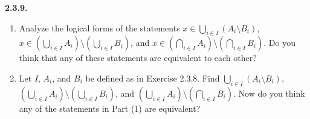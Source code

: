 \documentclass[12pt]{amsart}
\newenvironment{statement}[1]{\smallskip\noindent\color[rgb]{.6627, .3529, .6314} {\bf #1.}}{}
\theoremstyle{definition}
\theoremstyle{remark}
\begin{document}
\begin{statement}{2.3.9}
\begin{enumerate}
	\item Analyze the logical forms of the statements
	$x \in \bigcup_{i \in I} (A_i \setminus B_i)$,
	$x \in \left( \bigcup_{i \in I} A_i \right) \setminus \left( \bigcup_{i \in I} B_i \right)$, and
	$x \in \left( \bigcap_{i \in I} A_i \right) \setminus \left( \bigcap_{i \in I} B_i \right)$.
	Do you think that any of these statements are equivalent to each other?
	
	\item Let $I$, $A_i$, and $B_i$ be defined as in Exercise 2.3.8.
	Find $\bigcup_{i \in I} (A_i \setminus B_i)$,
	$\left( \bigcup_{i \in I} A_i \right) \setminus \left( \bigcup_{i \in I} B_i \right)$, and
	$\left( \bigcup_{i \in I} A_i \right) \setminus \left( \bigcap_{i \in I} B_i \right)$.
	Now do you think any of the statements in Part (1) are equivalent?
\end{enumerate}
\end{statement}
\end{document}
